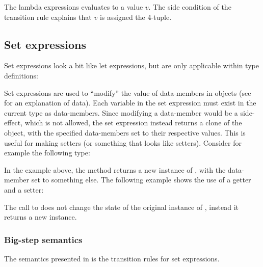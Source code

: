 The lambda expressions evaluates to a value $v$. The side condition of the
transition rule explains that $v$ is assigned the 4-tuple.

\subsection{Set expressions}

Set expressions look a bit like let expressions, but are only applicable within type definitions:

\begin{ebnf}
\end{ebnf}

Set expressions are used to ``modify'' the value of data-members in objects (see 
for an explanation of data). Each variable in the set expression must exist in the current type as
data-members. Since modifying a data-member would be a side-effect, which is not allowed, the set expression
instead returns a clone of the object, with the specified data-members set to their respective values. This
is useful for making setters (or something that looks like setters). Consider for example the following
type:


In the example above, the method  returns a new instance of , with
the data-member  set to something else. The following example shows the use of
a getter and a setter:


The call to  does not change the state of the original instance of ,
instead it returns a new instance.

\subsubsection{Big-step semantics}

The semantics presented in  is the transition rules for
set expressions.


